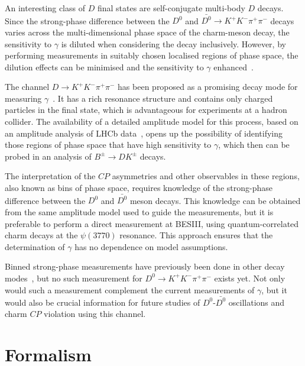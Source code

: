 \documentclass[12pt, a4paper, notitlepage, onecolumn]{article}
\begin{document}
An interesting class of $D$ final states are self-conjugate multi-body $D$ decays. Since the strong-phase difference between the $D^0$ and $\bar{D^0}\to K^+K^-\pi^+\pi^-$ decays varies across the multi-dimensional phase space of the charm-meson decay, the sensitivity to $\gamma$ is diluted when considering the decay inclusively. However, by performing measurements in suitably chosen localised regions of phase space, the dilution effects can be minimised and the sensitivity to $\gamma$ enhanced~\cite{Bondar, BondarPoluektov2006, BondarPoluektov2008, GiriGrossmanSofferZupan}.

The channel $D\to K^+K^-\pi^+\pi^-$ has been proposed as a promising decay mode for measuring $\gamma$~\cite{cite:RademackerWilkinson}. It has a rich resonance structure and contains only charged particles in the final state, which is advantageous for experiments at a hadron collider. The availability of a detailed amplitude model for this process, based on an amplitude analysis of LHCb data~\cite{LHCb-PAPER-2018-041}, opens up the possibility of identifying those regions of phase space that have high sensitivity to $\gamma$, which then can be probed in an analysis of $B^\pm\to DK^\pm$ decays.

The interpretation of the $C\!P$ asymmetries and other observables in these regions, also known as bins of phase space, requires knowledge of the strong-phase difference between the $D^0$ and $\bar{D^0}$ meson decays. This knowledge can be obtained from the same amplitude model used to guide the measurements, but it is preferable to perform a direct measurement at BESIII, using quantum-correlated charm decays at the $\psi(3770)$ resonance. This approach ensures that the determination of $\gamma$ has no dependence on model assumptions. 

Binned strong-phase measurements have previously been done in other decay modes~\cite{AppropriateReferences}, but no such measurement for $D^0\to K^+K^-\pi^+\pi^-$ exists yet. Not only would such a measurement complement the current measurements of $\gamma$, but it would also be crucial information for future studies of $D^0$-$\bar{D^0}$ oscillations and charm $C\!P$ violation using this channel.

\section{Formalism}
\end{document}
